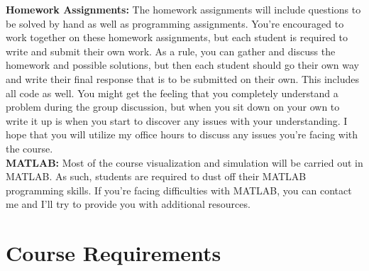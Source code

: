 \documentclass[a4paper]{article}
\begin{document}
\textbf{Homework Assignments:} The homework assignments will include questions to be solved by hand as well as programming assignments. You're encouraged to work together on these homework assignments, but each student is required to write and submit their own work. As a rule, you can gather and discuss the homework and possible solutions, but then each student should go their own way and write their final response that is to be submitted on their own. This includes all code as well. You might get the feeling that you completely understand a problem during the group discussion, but when you sit down on your own to write it up is when you start to discover any issues with your understanding. I hope that you will utilize my office hours to discuss any issues you're facing with the course. \\

\textbf{MATLAB:} Most of the course visualization and simulation will be carried out in MATLAB. As such, students are required to dust off their MATLAB programming skills. If you're facing difficulties with MATLAB, you can contact me and I'll try to provide you with additional resources. 



\section{Course Requirements}
\end{document}
